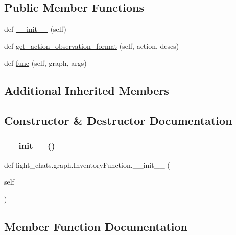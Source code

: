 \subsection*{Public Member Functions}
\begin{DoxyCompactItemize}
\item 
def \hyperlink{classlight__chats_1_1graph_1_1InventoryFunction_a4fa076967af0f8541f53e92721777f27}{\+\_\+\+\_\+init\+\_\+\+\_\+} (self)
\item 
def \hyperlink{classlight__chats_1_1graph_1_1InventoryFunction_a9527cd8b211efa8aafc21b2a40b14760}{get\+\_\+action\+\_\+observation\+\_\+format} (self, action, descs)
\item 
def \hyperlink{classlight__chats_1_1graph_1_1InventoryFunction_ae1d63ccf80bca5e20060ca5ffb8a684a}{func} (self, graph, args)
\end{DoxyCompactItemize}
\subsection*{Additional Inherited Members}


\subsection{Constructor \& Destructor Documentation}
\mbox{\label{classlight__chats_1_1graph_1_1InventoryFunction_a4fa076967af0f8541f53e92721777f27}} 
\subsubsection{\texorpdfstring{\+\_\+\+\_\+init\+\_\+\+\_\+()}{\_\_init\_\_()}}
{\footnotesize\ttfamily def light\+\_\+chats.\+graph.\+Inventory\+Function.\+\_\+\+\_\+init\+\_\+\+\_\+ (\begin{DoxyParamCaption}\item[{}]{self }\end{DoxyParamCaption})}



\subsection{Member Function Documentation}
\mbox{\label{classlight__chats_1_1graph_1_1InventoryFunction_ae1d63ccf80bca5e20060ca5ffb8a684a}} 

